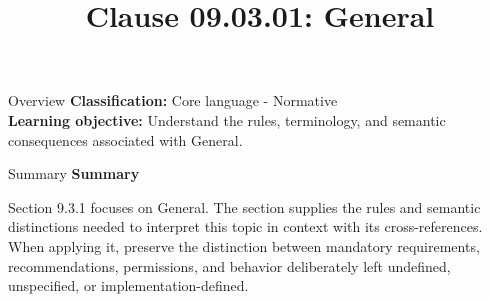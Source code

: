 \documentclass[10pt,letterpaper]{article}
\title{Clause 09.03.01: General}
\author{}
\date{}
\begin{document}
\maketitle
\begin{CornellOverviewBox}{Overview}
\textbf{Classification:} Core language - Normative\\[2pt]
\textbf{Learning objective:} Understand the rules, terminology, and semantic consequences associated with General.
\end{CornellOverviewBox}\begin{CornellSummaryBox}{Summary}
{\sffamily\bfseries\color{Accent} Summary}\par\vspace{3pt}Section 9.3.1 focuses on General. The section supplies the rules and semantic distinctions needed to interpret this topic in context with its cross-references. When applying it, preserve the distinction between mandatory requirements, recommendations, permissions, and behavior deliberately left undefined, unspecified, or implementation-defined.
\end{CornellSummaryBox}
\end{document}

